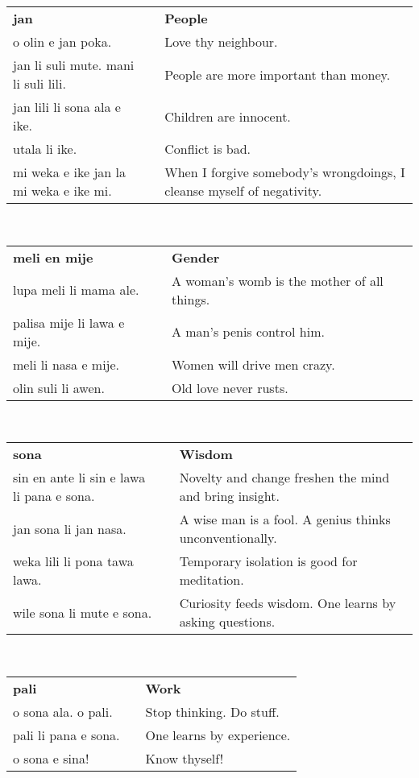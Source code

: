 %
\begin{supertabular}{p{6cm}|ll}
\textbf{jan} && \textbf{People} \\
o olin e jan poka.  && Love thy neighbour.  \\
jan li suli mute. mani li suli lili.  && People are more important than money. \\ 
jan lili li sona ala e ike.  && Children are innocent.  \\
utala li ike.  && Conflict is bad.  \\
mi weka e ike jan la mi weka e ike mi. && When I forgive somebody's wrongdoings, I cleanse myself of negativity.  \\
\end{supertabular} \\
%
\begin{supertabular}{p{6cm}|ll}
\textbf{meli en mije} && \textbf{Gender} \\
lupa meli li mama ale.  && A woman's womb is the mother of all things.  \\
palisa mije li lawa e mije.  && A man's penis control him.  \\
meli li nasa e mije. && Women will drive men crazy.  \\
olin suli li awen. && Old love never rusts. \\
\end{supertabular} \\
%
\begin{supertabular}{p{6cm}|ll}
\textbf{sona} && \textbf{Wisdom} \\
sin en ante li sin e lawa li pana e sona. && Novelty and change freshen the mind and bring insight. \\ 
jan sona li jan nasa.  && A wise man is a fool. A genius thinks unconventionally.  \\
weka lili li pona tawa lawa. && Temporary isolation is good for meditation. \\ 
wile sona li mute e sona.  && Curiosity feeds wisdom. One learns by asking questions.  \\ 
\end{supertabular} \\
%
\begin{supertabular}{p{6cm}|ll}
\textbf{pali} && \textbf{Work} \\
o sona ala. o pali.  && Stop thinking. Do stuff.  \\
pali li pana e sona.  && One learns by experience.  \\
o sona e sina!  && Know thyself!  \\
\end{supertabular} \\
